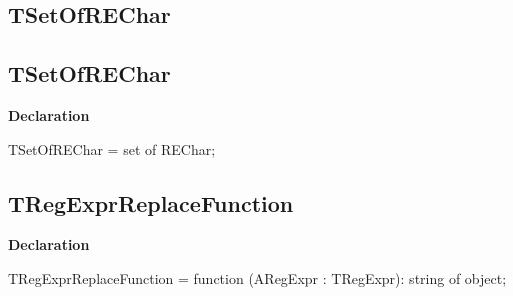 \documentclass{report}
\newif\ifpdf
\begin{document}
\subsection*{\large{\textbf{TSetOfREChar}}\normalsize\hspace{1ex}\hrulefill}
\else
\subsection*{TSetOfREChar}
\fi
\label{RegExpr-TSetOfREChar}
\begin{list}{}{
\setlength{\itemindent}{0cm}
\setlength{\listparindent}{0cm}
\setlength{\leftmargin}{\evensidemargin}
\addtolength{\leftmargin}{\tmplength}
\settowidth{\labelsep}{X}
\addtolength{\leftmargin}{\labelsep}
\setlength{\labelwidth}{\tmplength}
}
\item[\textbf{Declaration}\hfill]
\ifpdf
\begin{flushleft}
\fi
\begin{ttfamily}
TSetOfREChar = set of REChar;\end{ttfamily}

\ifpdf
\end{flushleft}
\fi

\end{list}
\ifpdf
\subsection*{\large{\textbf{TRegExprReplaceFunction}}\normalsize\hspace{1ex}\hrulefill}
\else
\subsection*{TRegExprReplaceFunction}
\fi
\label{RegExpr-TRegExprReplaceFunction}
\begin{list}{}{
\setlength{\itemindent}{0cm}
\setlength{\listparindent}{0cm}
\setlength{\leftmargin}{\evensidemargin}
\addtolength{\leftmargin}{\tmplength}
\settowidth{\labelsep}{X}
\addtolength{\leftmargin}{\labelsep}
\setlength{\labelwidth}{\tmplength}
}
\item[\textbf{Declaration}\hfill]
\ifpdf
\begin{flushleft}
\fi
\begin{ttfamily}
TRegExprReplaceFunction = function (ARegExpr : TRegExpr): string of object;\end{ttfamily}

\ifpdf
\end{flushleft}
\fi

\end{list}
\end{document}

